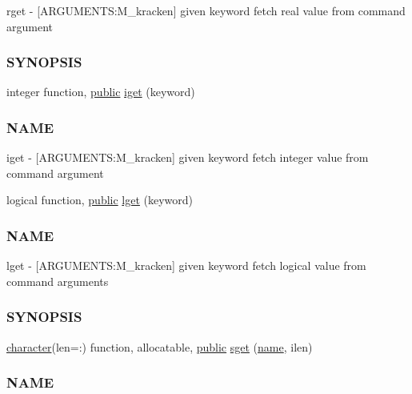 \begin{DoxyCompactItemize}
\begin{DoxyCompactList}
rget -\/ \mbox{[}A\+R\+G\+U\+M\+E\+N\+TS\+:M\+\_\+kracken\mbox{]} given keyword fetch real value from command argument \subsubsection*{S\+Y\+N\+O\+P\+S\+IS}\end{DoxyCompactList}\item 
integer function, \hyperlink{M__stopwatch_83_8txt_a2f74811300c361e53b430611a7d1769f}{public} \hyperlink{namespacem__kracken_a420718890eac378e5cd047dd0b477424}{iget} (keyword)
\begin{DoxyCompactList}\small\item\em \subsubsection*{N\+A\+ME}

iget -\/ \mbox{[}A\+R\+G\+U\+M\+E\+N\+TS\+:M\+\_\+kracken\mbox{]} given keyword fetch integer value from command argument \end{DoxyCompactList}\item 
logical function, \hyperlink{M__stopwatch_83_8txt_a2f74811300c361e53b430611a7d1769f}{public} \hyperlink{namespacem__kracken_a7141acd7a00c1a5aa5f90612a0414b63}{lget} (keyword)
\begin{DoxyCompactList}\small\item\em \subsubsection*{N\+A\+ME}

lget -\/ \mbox{[}A\+R\+G\+U\+M\+E\+N\+TS\+:M\+\_\+kracken\mbox{]} given keyword fetch logical value from command arguments \subsubsection*{S\+Y\+N\+O\+P\+S\+IS}\end{DoxyCompactList}\item 
\hyperlink{option__stopwatch_83_8txt_abd4b21fbbd175834027b5224bfe97e66}{character}(len=\+:) function, allocatable, \hyperlink{M__stopwatch_83_8txt_a2f74811300c361e53b430611a7d1769f}{public} \hyperlink{namespacem__kracken_a9a64192326816b0b9badcc11506628ee}{sget} (\hyperlink{M__stopwatch_83_8txt_a3f508a893ae4c3b397b4383e33b9bcae}{name}, ilen)
\begin{DoxyCompactList}\small\item\em \subsubsection*{N\+A\+ME}


\end{DoxyCompactList}
\end{DoxyCompactItemize}
